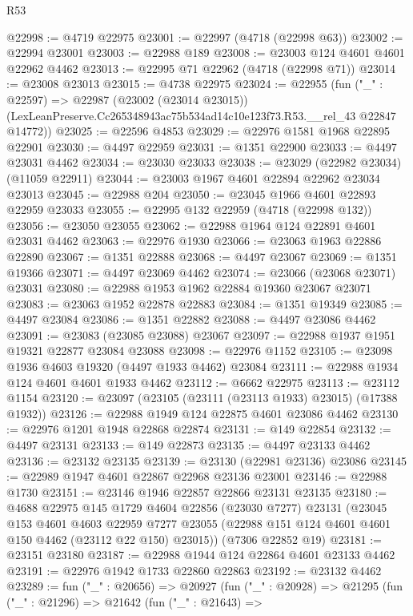 \begin{lexlean}{R53}
\begin{coremodule}
@22998 := @4719 @22975
@23001 := @22997 (@4718 (@22998 @63))
@23002 := @22994 @23001
@23003 := @22988 @189
@23008 := @23003 @124 @4601 @4601 @22962 @4462
@23013 := @22995 @71 @22962 (@4718 (@22998 @71))
@23014 := @23008 @23013
@23015 := @4738 @22975
@23024 := @22955
    (fun ("_" : @22597) =>
    @22987
      (@23002 (@23014 @23015))
      (LexLeanPreserve.Cc265348943ac75b534ad14c10e123f73.R53.__rel_43 @22847 @14772))
@23025 := @22596 @4853
@23029 := @22976 @1581 @1968 @22895 @22901
@23030 := @4497 @22959
@23031 := @1351 @22900
@23033 := @4497 @23031 @4462
@23034 := @23030 @23033
@23038 := @23029 (@22982 @23034) (@11059 @22911)
@23044 := @23003 @1967 @4601 @22894 @22962 @23034 @23013
@23045 := @22988 @204
@23050 := @23045 @1966 @4601 @22893 @22959 @23033
@23055 := @22995 @132 @22959 (@4718 (@22998 @132))
@23056 := @23050 @23055
@23062 := @22988 @1964 @124 @22891 @4601 @23031 @4462
@23063 := @22976 @1930
@23066 := @23063 @1963 @22886 @22890
@23067 := @1351 @22888
@23068 := @4497 @23067
@23069 := @1351 @19366
@23071 := @4497 @23069 @4462
@23074 := @23066 (@23068 @23071) @23031
@23080 := @22988 @1953 @1962 @22884 @19360 @23067 @23071
@23083 := @23063 @1952 @22878 @22883
@23084 := @1351 @19349
@23085 := @4497 @23084
@23086 := @1351 @22882
@23088 := @4497 @23086 @4462
@23091 := @23083 (@23085 @23088) @23067
@23097 := @22988 @1937 @1951 @19321 @22877 @23084 @23088
@23098 := @22976 @1152
@23105 := @23098 @1936 @4603 @19320 (@4497 @1933 @4462) @23084
@23111 := @22988 @1934 @124 @4601 @4601 @1933 @4462
@23112 := @6662 @22975
@23113 := @23112 @1154
@23120 := @23097 (@23105 (@23111 (@23113 @1933) @23015) (@17388 @1932))
@23126 := @22988 @1949 @124 @22875 @4601 @23086 @4462
@23130 := @22976 @1201 @1948 @22868 @22874
@23131 := @149 @22854
@23132 := @4497 @23131
@23133 := @149 @22873
@23135 := @4497 @23133 @4462
@23136 := @23132 @23135
@23139 := @23130 (@22981 @23136) @23086
@23145 := @22989 @1947 @4601 @22867 @22968 @23136 @23001
@23146 := @22988 @1730
@23151 := @23146 @1946 @22857 @22866 @23131 @23135
@23180 := @4688
    @22975
    @145
    @1729
    @4604
    @22856
    (@23030 @7277)
    @23131
    (@23045
      @153
      @4601
      @4603
      @22959
      @7277
      @23055
      (@22988 @151 @124 @4601 @4601 @150 @4462 (@23112 @22 @150) @23015))
    (@7306 @22852 @19)
@23181 := @23151 @23180
@23187 := @22988 @1944 @124 @22864 @4601 @23133 @4462
@23191 := @22976 @1942 @1733 @22860 @22863
@23192 := @23132 @4462
@23289 := fun ("_" : @20656) =>
  @20927
    (fun ("_" : @20928) =>
    @21295
      (fun ("_" : @21296) =>
      @21642
        (fun ("_" : @21643) =>

\end{coremodule}
\end{lexlean}
